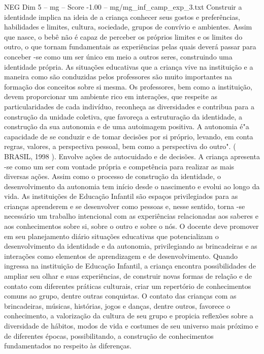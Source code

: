 \begin{textsample}{NEG Dim 5 – mg – Score -1.00 – mg/mg\_inf\_camp\_exp\_3.txt}
Construir a identidade implica na ideia de a criança conhecer seus gostos e preferências, habilidades e limites, cultura, sociedade, grupos de convívio e ambientes.
Assim que nasce, o bebê não é capaz de perceber os próprios limites e os limites do outro, o que tornam fundamentais as experiências pelas quais deverá passar para conceber -se como um ser único em meio a outros seres, construindo uma identidade própria.
As situações educativas que a criança vive na instituição e a maneira como são conduzidas pelos professores são muito importantes na formação dos conceitos sobre si mesma.
Os professores, bem como a instituição, devem proporcionar um ambiente rico em interações, que respeite as particularidades de cada indivíduo, reconheça as diversidades e contribua para a construção da unidade coletiva, que favoreça a estruturação da identidade, a construção da sua autonomia e de uma autoimagem positiva.
A autonomia é"a capacidade de se conduzir e de tomar decisões por si próprio, levando, em conta regras, valores, a perspectiva pessoal, bem como a perspectiva do outro". ( BRASIL, 1998 ).
Envolve ações de autocuidado e de decisões.
A criança apresenta -se como um ser com vontade própria e competência para realizar as mais diversas ações.
Assim como o processo de construção da identidade, o desenvolvimento da autonomia tem início desde o nascimento e evolui ao longo da vida.
As instituições de Educação Infantil são espaços privilegiados para as crianças aprenderem e se desenvolver como pessoas e, nesse sentido, torna -se necessário um trabalho intencional com as experiências relacionadas aos saberes e aos conhecimentos sobre si, sobre o outro e sobre o nós.
O docente deve promover em seu planejamento diário situações educativas que potencializam o desenvolvimento da identidade e da autonomia, privilegiando as brincadeiras e as interações como elementos de aprendizagem e de desenvolvimento.
Quando ingressa na instituição de Educação Infantil, a criança encontra possibilidades de ampliar seu olhar e suas experiências, de construir novas formas de relação e de contato com diferentes práticas culturais, criar um repertório de conhecimentos comuns ao grupo, dentre outras conquistas.
O contato das crianças com as brincadeiras, músicas, histórias, jogos e danças, dentre outros, favorece o conhecimento, a valorização da cultura de seu grupo e propicia reflexões sobre a diversidade de hábitos, modos de vida e costumes de seu universo mais próximo e de diferentes épocas, possibilitando, a construção de conhecimentos fundamentados no respeito às diferenças.

\end{textsample}
